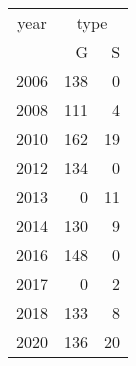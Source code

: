 \footnotesize\begin{tabular}[t]{lrr}
\toprule
\multicolumn{1}{c}{year} & \multicolumn{2}{c}{type} \\
\cmidrule(l{3pt}r{3pt}){1-1} \cmidrule(l{3pt}r{3pt}){2-3}
  & G & S\\
\midrule
2006 & 138 & 0\\
2008 & 111 & 4\\
2010 & 162 & 19\\
2012 & 134 & 0\\
2013 & 0 & 11\\
2014 & 130 & 9\\
2016 & 148 & 0\\
2017 & 0 & 2\\
2018 & 133 & 8\\
2020 & 136 & 20\\
\bottomrule
\end{tabular}
